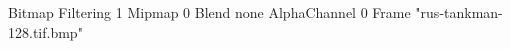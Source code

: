 {Bitmap
	{Filtering 1}
	{Mipmap 0}
	{Blend none}
	{AlphaChannel 0}
	{Frame "rus-tankman-128.tif.bmp"}
}
